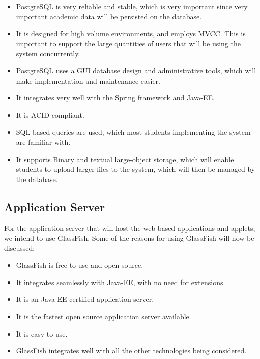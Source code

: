 \begin{itemize}
\item PostgreSQL is very reliable and stable, which is very important since very important academic data will be persisted on the database. 
\item It is designed for high volume environments, and employs MVCC. This is important to support the large quantities of users that will be using the system concurrently. 
\item PostgreSQL uses a GUI database design and administrative tools, which will make implementation and maintenance easier. 
\item It integrates very well with the Spring framework and Java-EE. 
\item It is ACID compliant. 
\item SQL based queries are used, which most students implementing the system are familiar with. 
\item It supports Binary and textual large-object storage, which will enable students to upload larger files to the system, which will then be managed by the database. 
\end{itemize}

\subsection{Application Server}

For the application server that will host the web based applications and applets, we intend to use GlassFish. Some of the reasons for using GlassFish will now be discussed:

\begin{itemize}
\item GlassFish is free to use and open source. 
\item It integrates seamlessly with Java-EE, with no need for extensions. 
\item It is an Java-EE certified application server.
\item It is the fastest open source application server available. 
\item It is easy to use. 
\item GlassFish integrates well with all the other technologies being considered. 
\end{itemize}

